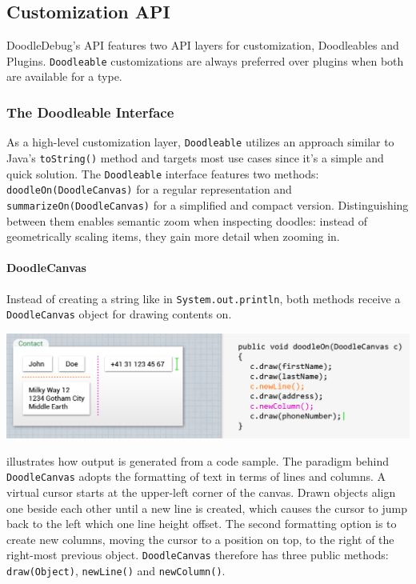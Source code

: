 \documentclass[english]{scrartcl}
\newcommand{\DD}{Dood\-le\-De\-bug\xspace}
\newcommand{\println}{\texttt{Sys\-tem.\-out.\-println}\xspace}
\begin{document}
\subsection{Customization API}
\DD's API features two API layers for customization, Doodleables and Plugins.
\texttt{Doodleable} customizations are always preferred over plugins when both are available for a type.

\subsubsection{The Doodleable Interface}

As a high-level customization layer, \texttt{Doodleable} utilizes an approach similar to Java's \texttt{toString()} method and targets most use cases since it's a simple and quick solution.
The \texttt{Doodleable} interface features two methods: \texttt{doodleOn(DoodleCanvas)} for a regular representation and \texttt{summarizeOn(DoodleCanvas)} for a simplified and compact version.
Distinguishing between them enables semantic zoom\cite{Wood98a} when inspecting doodles:
instead of geometrically scaling items, they gain more detail when zooming in.

\paragraph{DoodleCanvas}
Instead of creating a string like in \println, both methods receive a \texttt{DoodleCanvas} object for drawing contents on.

\begin{center}
	\includegraphics[width=\linewidth]{img/doodleable-example.png}
\end{center}

 illustrates how output is generated from a code sample.
The paradigm behind \texttt{DoodleCanvas} adopts the formatting of text in terms of lines and columns.
A virtual cursor starts at the upper-left corner of the canvas.
Drawn objects align one beside each other until a new line is created, which causes the cursor to jump back to the left which one line height offset.
The second formatting option is to create new columns, moving the cursor to a position on top, to the right of the right-most previous object.
\texttt{DoodleCanvas} therefore has three public methods: \texttt{draw(Object)}, \texttt{newLine()} and \texttt{newColumn()}.
\end{document}
